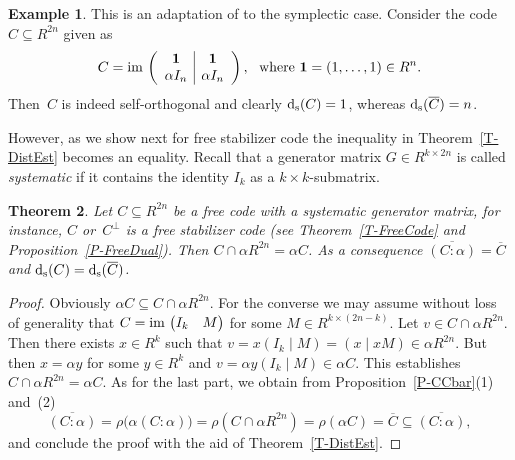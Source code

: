 \documentclass[11pt]{article}
\newtheorem{theo}{Theorem}[section]
\theoremstyle{definition}
\newtheorem{exa}[theo]{Example}
\numberwithin{equation}{section}
\newcommand{\im}{\mbox{\rm im}\,}
\newcommand{\ds}{\mbox{${\rm d}_{\rm s}$}}
\newcommand{\ov}[1]{\mbox{$\overline{#1}$}}
\newcounter{alp}
\newcounter{rom}
\begin{document}
\begin{exa}\label{E-dsCdsCbar}
This is an adaptation of \cite[Rem.~4.8(ii)]{NoSa00} to the symplectic case.
Consider the code $C\subseteq R^{2n}$ given as
\[
    C= \im\left(\begin{array}{c|c} {\mathbf 1}&{\mathbf 1}\\ \alpha I_n&\alpha I_n\end{array}\right),\ \text{ where }{\mathbf 1}=(1,\ldots,1)\in R^n.
\]
Then~$C$ is indeed self-orthogonal and clearly $\ds(C)=1$, whereas $\ds(\ov{C})=n$.
\end{exa}

However, as we show next for free stabilizer code the inequality in Theorem~\ref{T-DistEst} becomes an equality.
Recall that a generator matrix $G\in R^{k\times 2n}$ is called \emph{systematic} if it contains the identity $I_k$ as a $k\times k$-submatrix.

\begin{theo}\label{T-DistFree}
Let $C\subseteq R^{2n}$ be a free code with a systematic generator matrix, for instance, $C$ or~$C^{\perp}$ is a free stabilizer code (see Theorem~\ref{T-FreeCode} and
Proposition~\ref{P-FreeDual}).
Then $C\cap \alpha R^{2n} = \alpha C$. As a consequence $\ov{(C:\alpha)} = \ov{C}$ and $\ds(C) = \ds(\ov{C})$.
\end{theo}

\begin{proof}
Obviously $\alpha C \subseteq C \cap \alpha R^{2n}$.
For the converse we may assume without loss of generality that $C=\im\begin{pmatrix}I_k&M\end{pmatrix}$ for some $M\in R^{k\times(2n-k)}$.
Let $v \in C \cap \alpha R^{2n}$.
Then there exists $x \in R^k$ such that $v = x(I_k \mid M) = (x \mid xM) \in \alpha R^{2n}$.
But then $x=\alpha y$ for some $y\in R^k$ and $v=\alpha y(I_k \mid M)\in\alpha C$.
This establishes $C\cap \alpha R^{2n} = \alpha C$.
As for the last part, we obtain from Proposition~\ref{P-CCbar}(1) and~(2)
\[
  \ov{(C:\alpha)}=\rho\big(\alpha(C:\alpha)\big)=\rho(C\cap\alpha R^{2n})=\rho(\alpha C)=\ov{C}\subseteq\ov{(C:\alpha)},
\]
and conclude the proof with the aid of Theorem~\ref{T-DistEst}.
\end{proof}
\end{document}
